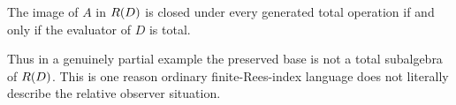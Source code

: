 \begin{proposition}
\label{prop:old-image-closed}
The image of $A$ in $R(D)$ is closed under every generated total operation
if and only if the evaluator of $D$ is total.
\end{proposition}

Thus in a genuinely partial example the preserved base is not a total
subalgebra of $R(D)$.  This is one reason ordinary finite-Rees-index
language does not literally describe the relative observer situation.
